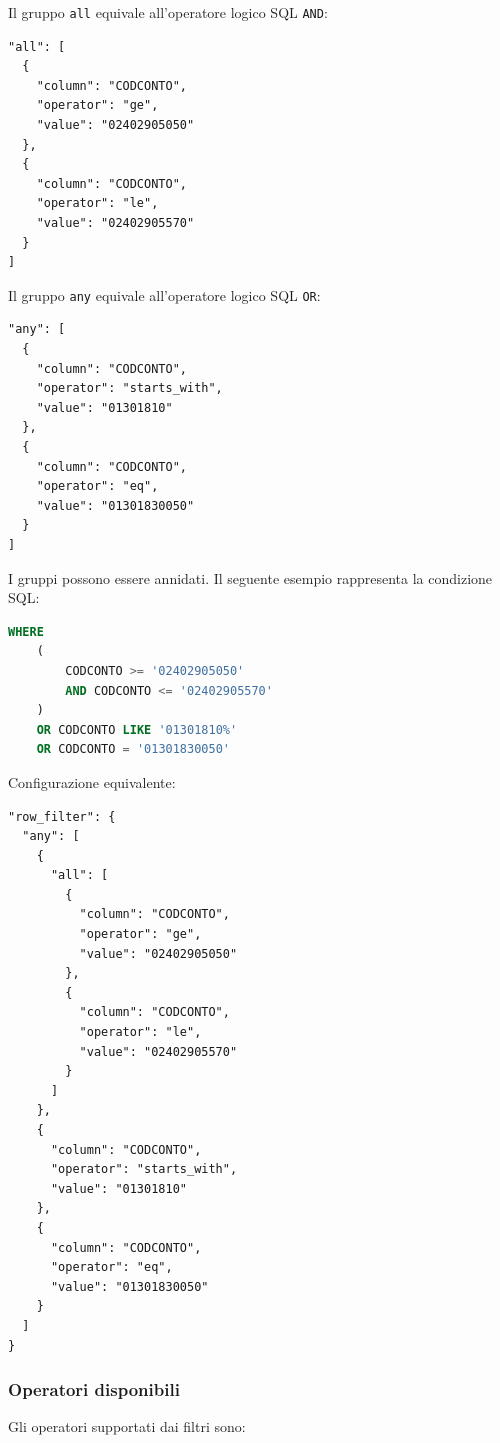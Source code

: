 Il gruppo \texttt{all} equivale all'operatore logico SQL \texttt{AND}:

\begin{lstlisting}
"all": [
  {
    "column": "CODCONTO",
    "operator": "ge",
    "value": "02402905050"
  },
  {
    "column": "CODCONTO",
    "operator": "le",
    "value": "02402905570"
  }
]
\end{lstlisting}

Il gruppo \texttt{any} equivale all'operatore logico SQL \texttt{OR}:

\begin{lstlisting}
"any": [
  {
    "column": "CODCONTO",
    "operator": "starts_with",
    "value": "01301810"
  },
  {
    "column": "CODCONTO",
    "operator": "eq",
    "value": "01301830050"
  }
]
\end{lstlisting}

I gruppi possono essere annidati. Il seguente esempio rappresenta la
condizione SQL:

\begin{lstlisting}[language=SQL]
WHERE
    (
        CODCONTO >= '02402905050'
        AND CODCONTO <= '02402905570'
    )
    OR CODCONTO LIKE '01301810%'
    OR CODCONTO = '01301830050'
\end{lstlisting}

Configurazione equivalente:

\begin{lstlisting}
"row_filter": {
  "any": [
    {
      "all": [
        {
          "column": "CODCONTO",
          "operator": "ge",
          "value": "02402905050"
        },
        {
          "column": "CODCONTO",
          "operator": "le",
          "value": "02402905570"
        }
      ]
    },
    {
      "column": "CODCONTO",
      "operator": "starts_with",
      "value": "01301810"
    },
    {
      "column": "CODCONTO",
      "operator": "eq",
      "value": "01301830050"
    }
  ]
}
\end{lstlisting}

\subsubsection{Operatori disponibili}

Gli operatori supportati dai filtri sono:

